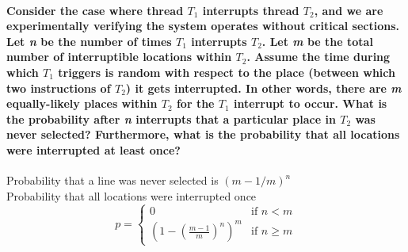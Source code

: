 \documentclass[a4paper]{article}
\begin{document}
\paragraph{Consider the case where thread $T_1$ interrupts thread $T_2$, and we are experimentally verifying the 
system operates without critical sections. Let \emph{n} be the number of times $T_1$ interrupts $T_2$. Let 
\emph{m} be the total number of interruptible locations within  $T_2$. Assume the time during which $T_1$ triggers 
is random with respect to the place (between which two instructions of  $T_2$) it gets interrupted. In other words, 
there are \emph{m} equally-likely places within $T_2$ for the $T_1$ interrupt to occur. What is the probability 
after \emph{n} interrupts that a particular place in  $T_2$ was never selected? Furthermore, what is the 
probability that all locations were interrupted at least once?\\}

Probability that a line was never selected is $(m-1/m) ^ n$ \\
Probability that all locations were interrupted once
\begin{equation*}
p =
\begin{cases}
  0                                            &\mbox{if } n < m \\
  \left( 1-\left(\frac{m-1}{m} \right)^n \right)^m         &\mbox{if } n \ge m
\end{cases}
\end{equation*}
\end{document}
